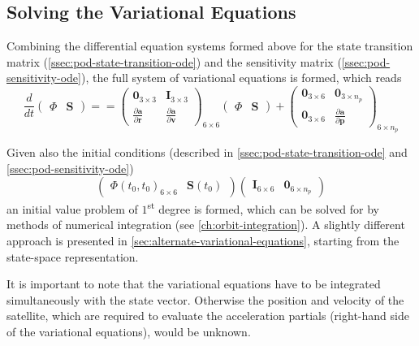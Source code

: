 \subsection{Solving the Variational Equations}\label{ssec:pod-varequations-solution}
Combining the differential equation systems formed above for the state transition matrix 
(\autoref{ssec:pod-state-transition-ode}) and the sensitivity matrix (\autoref{ssec:pod-sensitivity-ode}),
the full system of variational equations is formed, which reads
\begin{equation}\label{eq:mont745}
    \frac{d}{dt} \begin{pmatrix} \Phi & \bm{S} \end{pmatrix} = 
    = \begin{pmatrix}
        \bm{0}_{3 \times 3} & \bm{I}_{3 \times 3} \\
        \frac{\partial \bm{a}}{\partial \bm{r}} &
        \frac{\partial \bm{a}}{\partial \bm{v}}
    \end{pmatrix}_{6 \times 6} \begin{pmatrix} \Phi & \bm{S} \end{pmatrix}
    + 
    \begin{pmatrix}
        \bm{0}_{3 \times 6} & \bm{0}_{3 \times n_p} \\
        \bm{0}_{3 \times 6} & \frac{\partial \bm{a}}{\partial \bm{p}}
    \end{pmatrix}_{6 \times n_p}
\end{equation}

Given also the initial conditions (described in \autoref{ssec:pod-state-transition-ode} and
\autoref{ssec:pod-sensitivity-ode})
\begin{equation}
    \begin{pmatrix}\Phi (t_0,t_0) _{6 \times 6} & \bm{S}(t_0) _{}\end{pmatrix}
    \begin{pmatrix} \bm{I}_{6 \times 6} & \bm{0}_{6 \times n_p} \end{pmatrix}
\end{equation}
an initial value problem of $1$\textsuperscript{st} degree is formed, which can 
be solved for by methods of numerical integration (see \autoref{ch:orbit-integration}).
A slightly different approach is presented in \autoref{sec:alternate-variational-equations}, 
starting from the state-space representation.

It is important to note that the variational equations have to be integrated 
simultaneously with the state vector. Otherwise the position and velocity of the 
satellite, which are required to evaluate the acceleration partials (right-hand 
side of the variational equations), would be unknown. 
